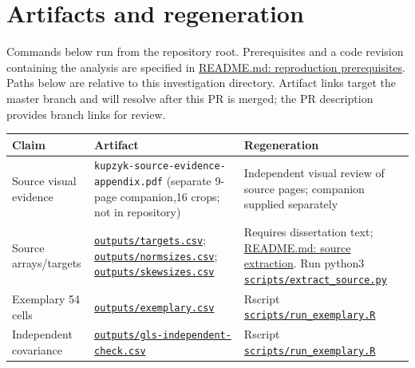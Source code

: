 \documentclass[11pt]{article}
\begin{document}
\section{Artifacts and regeneration}
Commands below run from the repository root. Prerequisites and a code revision containing the analysis are specified in \href{https://github.com/alectionary/vibe-math/blob/master/formalization/kupzyk-power-assumptions/README.md#reproduction-prerequisites}{README.md: reproduction prerequisites}. Paths below are relative to this investigation directory. Artifact links target the master branch and will resolve after this PR is merged; the PR description provides branch links for review.
\small\begin{longtable}{>{\raggedright\arraybackslash}p{.22\linewidth}>{\raggedright\arraybackslash}p{.35\linewidth}>{\raggedright\arraybackslash}p{.35\linewidth}}\toprule Claim&Artifact&Regeneration\\\midrule\endhead
Source visual evidence&\nolinkurl{kupzyk-source-evidence-appendix.pdf} (separate 9-page companion,16 crops; not in repository)&Independent visual review of source pages; companion supplied separately\\
Source arrays/targets&\href{https://github.com/alectionary/vibe-math/blob/master/formalization/kupzyk-power-assumptions/outputs/targets.csv}{\nolinkurl{outputs/targets.csv}}; \href{https://github.com/alectionary/vibe-math/blob/master/formalization/kupzyk-power-assumptions/outputs/normsizes.csv}{\nolinkurl{outputs/normsizes.csv}}; \href{https://github.com/alectionary/vibe-math/blob/master/formalization/kupzyk-power-assumptions/outputs/skewsizes.csv}{\nolinkurl{outputs/skewsizes.csv}}&Requires dissertation text; \href{https://github.com/alectionary/vibe-math/blob/master/formalization/kupzyk-power-assumptions/README.md#source-provenance-and-input-extraction}{README.md: source extraction}. Run python3 \href{https://github.com/alectionary/vibe-math/blob/master/formalization/kupzyk-power-assumptions/scripts/extract_source.py}{\nolinkurl{scripts/extract_source.py}}\\
Exemplary 54 cells&\href{https://github.com/alectionary/vibe-math/blob/master/formalization/kupzyk-power-assumptions/outputs/exemplary.csv}{\nolinkurl{outputs/exemplary.csv}}&Rscript \href{https://github.com/alectionary/vibe-math/blob/master/formalization/kupzyk-power-assumptions/scripts/run_exemplary.R}{\nolinkurl{scripts/run_exemplary.R}}\\
Independent covariance&\href{https://github.com/alectionary/vibe-math/blob/master/formalization/kupzyk-power-assumptions/outputs/gls-independent-check.csv}{\nolinkurl{outputs/gls-independent-check.csv}}&Rscript \href{https://github.com/alectionary/vibe-math/blob/master/formalization/kupzyk-power-assumptions/scripts/run_exemplary.R}{\nolinkurl{scripts/run_exemplary.R}}\\

\end{longtable}
\end{document}
